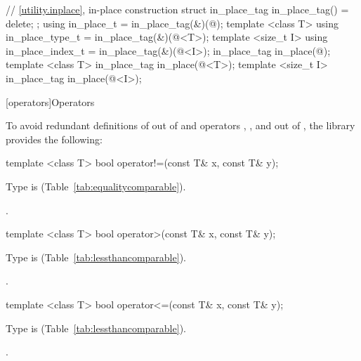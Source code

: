 \begin{codeblock}
{  // \ref{utility.inplace}, in-place construction
  struct in_place_tag {
    in_place_tag() = delete;
  };
  using in_place_t = in_place_tag(&)(@\unspec@);
  template <class T>
    using in_place_type_t = in_place_tag(&)(@\unspec@<T>);
  template <size_t I>
    using in_place_index_t = in_place_tag(&)(@\unspec@<I>);
  in_place_tag in_place(@\unspec@);
  template <class T>
    in_place_tag in_place(@\unspec@<T>);
  template <size_t I>
    in_place_tag in_place(@\unspec@<I>);
}
\end{codeblock}

[operators]{Operators}

\pnum
To avoid redundant definitions of  out of 
and operators \tcode{>}, \tcode{<=}, and \tcode{>=} out of ,
the library provides the following:

%
\begin{itemdecl}
template <class T> bool operator!=(const T& x, const T& y);
\end{itemdecl}

\begin{itemdescr}
\pnum
\requires
Type  is  (Table~\ref{tab:equalitycomparable}).

\pnum
\returns
{}.
\end{itemdescr}

%
\begin{itemdecl}
template <class T> bool operator>(const T& x, const T& y);
\end{itemdecl}

\begin{itemdescr}
\pnum
\requires
Type  is  (Table~\ref{tab:lessthancomparable}).

\pnum
\returns
{}.
\end{itemdescr}

%
\begin{itemdecl}
template <class T> bool operator<=(const T& x, const T& y);
\end{itemdecl}

\begin{itemdescr}
\pnum
\requires
Type  is  (Table~\ref{tab:lessthancomparable}).

\pnum
\returns
{}.
\end{itemdescr}

